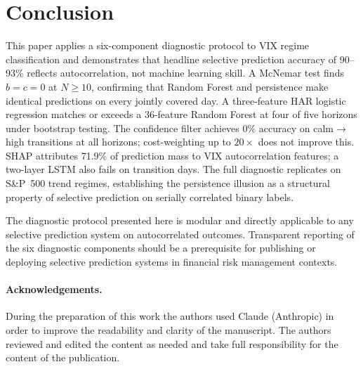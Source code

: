 \documentclass[runningheads]{llncs}
\begin{document}
\section{Conclusion}

This paper applies a six-component diagnostic protocol to VIX regime
classification and demonstrates that headline selective prediction accuracy
of 90--93\% reflects autocorrelation, not machine learning skill.
A McNemar test finds $b = c = 0$ at $N \geq 10$, confirming that Random
Forest and persistence make identical predictions on every jointly covered
day. A three-feature HAR logistic regression matches or exceeds a 36-feature
Random Forest at four of five horizons under bootstrap testing. The confidence
filter achieves 0\% accuracy on calm$\to$high transitions at all horizons;
cost-weighting up to $20\times$ does not improve this. SHAP attributes 71.9\%
of prediction mass to VIX autocorrelation features; a two-layer LSTM also
fails on transition days. The full diagnostic replicates on S\&P~500 trend
regimes, establishing the persistence illusion as a structural property of
selective prediction on serially correlated binary labels.

The diagnostic protocol presented here is modular and directly applicable to
any selective prediction system on autocorrelated outcomes. Transparent
reporting of the six diagnostic components should be a prerequisite for
publishing or deploying selective prediction systems in financial risk
management contexts.

\paragraph{Acknowledgements.}
During the preparation of this work the authors used Claude (Anthropic) in
order to improve the readability and clarity of the manuscript. The authors
reviewed and edited the content as needed and take full responsibility for
the content of the publication.



\end{document}
